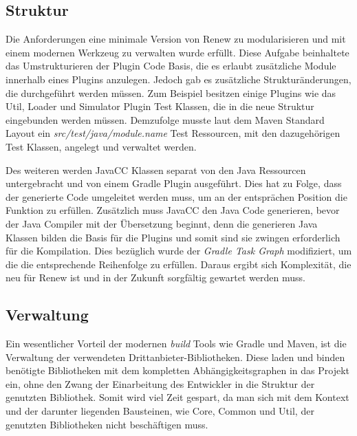 \subsection{Struktur} \label{sub:struktur}
	Die Anforderungen eine minimale Version von Renew zu modularisieren und mit einem modernen Werkzeug zu verwalten wurde erfüllt. Diese Aufgabe beinhaltete das Umstrukturieren der Plugin Code Basis, die es erlaubt zusätzliche Module innerhalb eines Plugins anzulegen. Jedoch gab es zusätzliche Strukturänderungen, die durchgeführt werden müssen. Zum Beispiel besitzen einige Plugins wie das Util, Loader und Simulator Plugin Test Klassen, die in die neue Struktur eingebunden werden müssen. Demzufolge musste laut dem Maven Standard Layout ein \textit{src/test/java/module.name} Test Ressourcen, mit den dazugehörigen Test Klassen, angelegt und verwaltet werden. 

	Des weiteren werden JavaCC Klassen separat von den Java Ressourcen untergebracht und von einem Gradle Plugin ausgeführt. Dies hat zu Folge, dass der generierte Code umgeleitet werden muss, um an der entsprächen Position die Funktion zu erfüllen. Zusätzlich muss JavaCC den Java Code generieren, bevor der Java Compiler mit der Übersetzung beginnt, denn die generieren Java Klassen bilden die Basis für die Plugins und somit sind sie zwingen erforderlich für die Kompilation. Dies bezüglich wurde der \textit{Gradle Task Graph} modifiziert, um die die entsprechende Reihenfolge zu erfüllen. Daraus ergibt sich Komplexität, die neu für Renew ist und in der Zukunft sorgfältig gewartet werden muss. 
	\bigbreak

\subsection{Verwaltung} \label{sub:verwaltung}

	Ein wesentlicher Vorteil der modernen \textit{build} Tools wie Gradle und Maven, ist die Verwaltung der verwendeten Drittanbieter-Bibliotheken. Diese laden und binden benötigte Bibliotheken mit dem kompletten Abhängigkeitsgraphen in das Projekt ein, ohne den Zwang der Einarbeitung des Entwickler in die Struktur der genutzten Bibliothek. Somit wird viel Zeit gespart, da man sich mit dem Kontext und der darunter liegenden Bausteinen, wie Core, Common und Util, der genutzten Bibliotheken nicht beschäftigen muss. 


